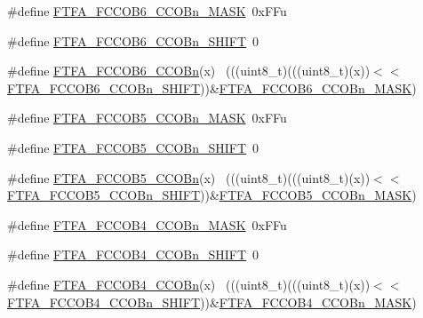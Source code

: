 \begin{DoxyCompactItemize}
\item 
\#define \hyperlink{group___f_t_f_a___register___masks_ga35746ac0168b284ea3f29b1b6f47d932}{F\+T\+F\+A\+\_\+\+F\+C\+C\+O\+B6\+\_\+\+C\+C\+O\+Bn\+\_\+\+M\+A\+SK}~0x\+F\+Fu
\item 
\#define \hyperlink{group___f_t_f_a___register___masks_gaf859b028e8f5d2dfdbaed9aeccc6c66c}{F\+T\+F\+A\+\_\+\+F\+C\+C\+O\+B6\+\_\+\+C\+C\+O\+Bn\+\_\+\+S\+H\+I\+FT}~0
\item 
\#define \hyperlink{group___f_t_f_a___register___masks_ga18849d340dcdc20ea40db2b7983c1ec3}{F\+T\+F\+A\+\_\+\+F\+C\+C\+O\+B6\+\_\+\+C\+C\+O\+Bn}(x)                                      ~(((uint8\+\_\+t)(((uint8\+\_\+t)(x))$<$$<$\hyperlink{group___f_t_f_a___register___masks_gaf859b028e8f5d2dfdbaed9aeccc6c66c}{F\+T\+F\+A\+\_\+\+F\+C\+C\+O\+B6\+\_\+\+C\+C\+O\+Bn\+\_\+\+S\+H\+I\+FT}))\&\hyperlink{group___f_t_f_a___register___masks_ga35746ac0168b284ea3f29b1b6f47d932}{F\+T\+F\+A\+\_\+\+F\+C\+C\+O\+B6\+\_\+\+C\+C\+O\+Bn\+\_\+\+M\+A\+SK})
\item 
\#define \hyperlink{group___f_t_f_a___register___masks_ga6112d953d0c0527ada279726c9b0c5a3}{F\+T\+F\+A\+\_\+\+F\+C\+C\+O\+B5\+\_\+\+C\+C\+O\+Bn\+\_\+\+M\+A\+SK}~0x\+F\+Fu
\item 
\#define \hyperlink{group___f_t_f_a___register___masks_ga632fbfd380fcb5f46e4388b4edb490b2}{F\+T\+F\+A\+\_\+\+F\+C\+C\+O\+B5\+\_\+\+C\+C\+O\+Bn\+\_\+\+S\+H\+I\+FT}~0
\item 
\#define \hyperlink{group___f_t_f_a___register___masks_ga14b3943ceda09b2fc2066e2728c4af08}{F\+T\+F\+A\+\_\+\+F\+C\+C\+O\+B5\+\_\+\+C\+C\+O\+Bn}(x)                                      ~(((uint8\+\_\+t)(((uint8\+\_\+t)(x))$<$$<$\hyperlink{group___f_t_f_a___register___masks_ga632fbfd380fcb5f46e4388b4edb490b2}{F\+T\+F\+A\+\_\+\+F\+C\+C\+O\+B5\+\_\+\+C\+C\+O\+Bn\+\_\+\+S\+H\+I\+FT}))\&\hyperlink{group___f_t_f_a___register___masks_ga6112d953d0c0527ada279726c9b0c5a3}{F\+T\+F\+A\+\_\+\+F\+C\+C\+O\+B5\+\_\+\+C\+C\+O\+Bn\+\_\+\+M\+A\+SK})
\item 
\#define \hyperlink{group___f_t_f_a___register___masks_ga42b1625323567bb015cf90601b468433}{F\+T\+F\+A\+\_\+\+F\+C\+C\+O\+B4\+\_\+\+C\+C\+O\+Bn\+\_\+\+M\+A\+SK}~0x\+F\+Fu
\item 
\#define \hyperlink{group___f_t_f_a___register___masks_ga22245895591851bc7a547b2fe5464b63}{F\+T\+F\+A\+\_\+\+F\+C\+C\+O\+B4\+\_\+\+C\+C\+O\+Bn\+\_\+\+S\+H\+I\+FT}~0
\item 
\#define \hyperlink{group___f_t_f_a___register___masks_ga7297ff00a0f9f70436256a42ad07d167}{F\+T\+F\+A\+\_\+\+F\+C\+C\+O\+B4\+\_\+\+C\+C\+O\+Bn}(x)                                      ~(((uint8\+\_\+t)(((uint8\+\_\+t)(x))$<$$<$\hyperlink{group___f_t_f_a___register___masks_ga22245895591851bc7a547b2fe5464b63}{F\+T\+F\+A\+\_\+\+F\+C\+C\+O\+B4\+\_\+\+C\+C\+O\+Bn\+\_\+\+S\+H\+I\+FT}))\&\hyperlink{group___f_t_f_a___register___masks_ga42b1625323567bb015cf90601b468433}{F\+T\+F\+A\+\_\+\+F\+C\+C\+O\+B4\+\_\+\+C\+C\+O\+Bn\+\_\+\+M\+A\+SK})
$$
\end{DoxyCompactItemize}
